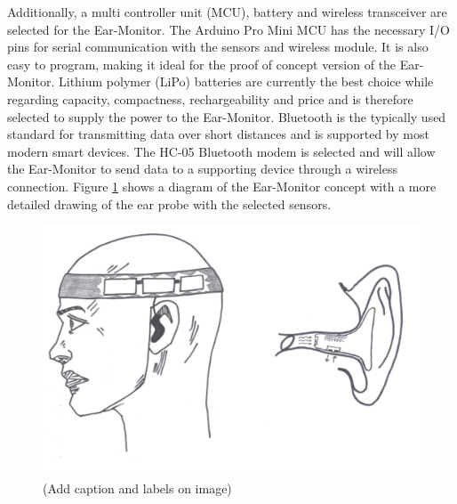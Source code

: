 \medskip

Additionally, a multi controller unit (MCU), battery and wireless transceiver are selected for the Ear-Monitor. The Arduino Pro Mini MCU has the necessary I/O pins for serial communication with the sensors and wireless module. It is also easy to program, making it ideal for the proof of concept version of the Ear-Monitor. Lithium polymer (LiPo) batteries are currently the best choice while regarding capacity, compactness, rechargeability and price and is therefore selected to supply the power to the Ear-Monitor. Bluetooth is the typically used standard for transmitting data over short distances and is supported by most modern smart devices. The HC-05 Bluetooth modem is selected and will allow the Ear-Monitor to send data to a supporting device through a wireless connection. Figure \ref{fig:EarMonitor_Concept} shows a diagram of the Ear-Monitor concept with a more detailed drawing of the ear probe with the selected sensors.


\begin{figure}[H]
   \centering
   \includegraphics[scale=0.6]{figs/EarMonitor_Concept.pdf}
   \caption{(Add caption and labels on image)}
   \label{fig:EarMonitor_Concept}
\end{figure}

